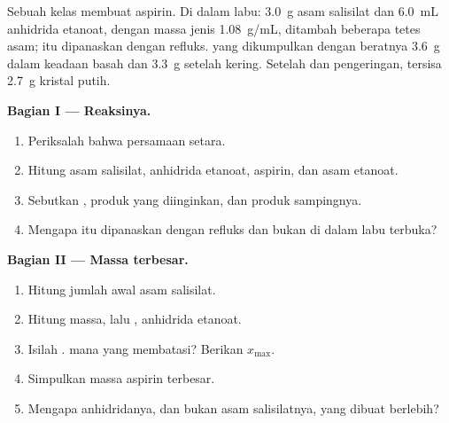 \begin{problem}
\label{pb:g10:synthesis-yield:1}
Sebuah kelas membuat aspirin. Di dalam labu: \qty{3.0}{g} asam
salisilat dan \qty{6.0}{mL} anhidrida etanoat, dengan massa jenis
\qty{1.08}{g/mL}, ditambah beberapa tetes asam;  itu dipanaskan
dengan refluks.  yang dikumpulkan dengan 
beratnya \qty{3.6}{g} dalam keadaan basah dan \qty{3.3}{g} setelah
kering. Setelah  dan pengeringan, tersisa \qty{2.7}{g}
kristal putih.

\medskip
\noindent\textbf{Bagian I --- Reaksinya.}
\begin{enumerate}
  \item Periksalah bahwa persamaan
         setara.
  \item Hitung  asam salisilat, anhidrida etanoat, aspirin,
        dan asam etanoat.
  \item Sebutkan , produk yang diinginkan, dan produk
        sampingnya.
  \item Mengapa  itu dipanaskan dengan refluks dan bukan di dalam
        labu terbuka?
\end{enumerate}

\medskip
\noindent\textbf{Bagian II --- Massa terbesar.}
\begin{enumerate}[resume]
  \item Hitung jumlah awal asam salisilat.
  \item Hitung massa, lalu , anhidrida etanoat.
  \item Isilah .  mana yang membatasi? Berikan
        $x_{\max}$.
  \item Simpulkan massa aspirin terbesar.
  \item Mengapa anhidridanya, dan bukan asam salisilatnya, yang dibuat
        berlebih?
\end{enumerate}


\end{problem}
